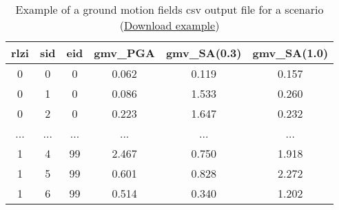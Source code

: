 \begin{table}[htbp]
\centering
\begin{tabular}{cccccc}

\hline
\rowcolor{lightgray}
\textbf{rlzi} & \textbf{sid} & \textbf{eid} & \textbf{gmv\_PGA} & \textbf{gmv\_SA(0.3)} & \textbf{gmv\_SA(1.0)} \\
\hline
0 & 0 & 0 & 0.062 & 0.119 & 0.157 \\
0 & 1 & 0 & 0.086 & 1.533 & 0.260 \\
0 & 2 & 0 & 0.223 & 1.647 & 0.232 \\
... & ... & ... & ... & ... & ... \\
1 & 4 & 99 & 2.467 & 0.750 & 1.918 \\
1 & 5 & 99 & 0.601 & 0.828 & 2.272 \\
1 & 6 & 99 & 0.514 & 0.340 & 1.202
\hline

\end{tabular}
\caption{Example of a ground motion fields csv output file for a scenario (\href{https://raw.githubusercontent.com/gem/oq-engine/master/doc/manual/oqum/hazard/verbatim/output_scenario_gmfs.csv}{Download example})}
\label{output:gmf_scenario}
\end{table}
